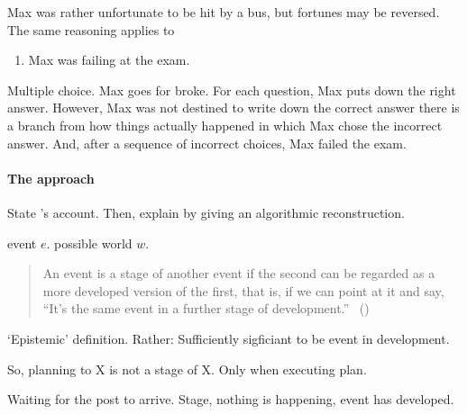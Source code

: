 \begin{note}
  Max was rather unfortunate to be hit by a bus, but fortunes may be reversed.
  The same reasoning applies to

  \begin{enumerate}
  \item
    \label{prog:max:good}
    Max was failing at the exam.
  \end{enumerate}

  Multiple choice.
  Max goes for broke.
  For each question, Max puts down the right answer.
  However, Max was not destined to write down the correct answer there is a branch from how things actually happened in which Max chose the incorrect answer.
  And, after a sequence of incorrect choices, Max failed the exam.
\end{note}

\paragraph{The approach}

\begin{note}
  State \citeauthor{Landman:1992wh}'s account.
  Then, explain by giving an algorithmic reconstruction.
\end{note}

\begin{note}
  event \(e\).
  possible world \(w\).
\end{note}

\begin{note}
  \begin{quote}
    An event is a stage of another event if the second can be regarded as a more developed version of the first, that is, if we can point at it and say, ``It's the same event in a further stage of development.''\newline
    \mbox{ }\hfill\mbox{(\citeyear[23]{Landman:1992wh})}
  \end{quote}
  `Epistemic' definition.
  Rather:
  Sufficiently sigficiant to be event in development.

  So, planning to X is not a stage of X.
  Only when executing plan.

  Waiting for the post to arrive.
  Stage, nothing is happening, event has developed.
\end{note}

